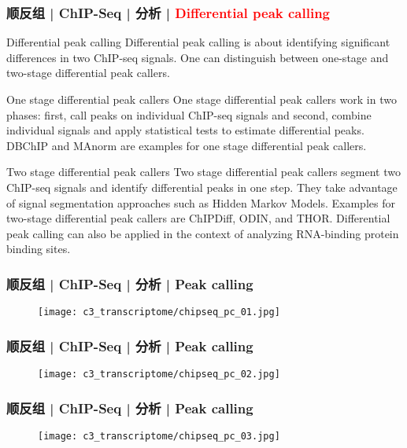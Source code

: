 \begin{frame}
  \frametitle{顺反组 | ChIP-Seq | 分析 | \textcolor{red}{Differential peak calling}}
  {\footnotesize
  \begin{block}{Differential peak calling}
  Differential peak calling is about identifying significant differences in two ChIP-seq signals. One can distinguish between one-stage and two-stage differential peak callers.
  \end{block}
  \pause
  \begin{block}{One stage differential peak callers}
    One stage differential peak callers work in two phases: first, call peaks on individual ChIP-seq signals and second, combine individual signals and apply statistical tests to estimate differential peaks. DBChIP and MAnorm are examples for one stage differential peak callers.
  \end{block}
  \pause
  \begin{block}{Two stage differential peak callers}
 Two stage differential peak callers segment two ChIP-seq signals and identify differential peaks in one step. They take advantage of signal segmentation approaches such as Hidden Markov Models. Examples for two-stage differential peak callers are ChIPDiff, ODIN, and THOR. Differential peak calling can also be applied in the context of analyzing RNA-binding protein binding sites. 
  \end{block}
  }
\end{frame}

\begin{frame}
  \frametitle{顺反组 | ChIP-Seq | 分析 | Peak calling}
  \begin{figure}
    \centering
    \texttt{[image: c3\_transcriptome/chipseq\_pc\_01.jpg]}
  \end{figure}
\end{frame}

\begin{frame}
  \frametitle{顺反组 | ChIP-Seq | 分析 | Peak calling}
  \begin{figure}
    \centering
    \texttt{[image: c3\_transcriptome/chipseq\_pc\_02.jpg]}
  \end{figure}
\end{frame}

\begin{frame}
  \frametitle{顺反组 | ChIP-Seq | 分析 | Peak calling}
  \begin{figure}
    \centering
    \texttt{[image: c3\_transcriptome/chipseq\_pc\_03.jpg]}
  \end{figure}
\end{frame}

